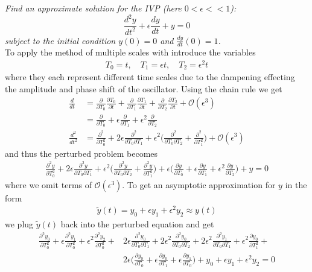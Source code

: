 \documentclass[12pt]{article}
\theoremstyle{remark}
\begin{document}
\textit{Find an approximate solution for the IVP (here $0 < \epsilon << 1$):}
$$ \frac{d^2y}{dt^2} + \epsilon\frac{dy}{dt} + y = 0 $$
\textit{subject to the initial condition $y(0) = 0$ and $\frac{dy}{dt}(0) = 1$.} \\

To apply the method of multiple scales with introduce the variables
\begin{align*}
	T_0 = t, \quad T_1 = \epsilon t, \quad T_2 = \epsilon^2 t
\end{align*}
where they each represent different time scales due to the dampening effecting the amplitude and phase shift of the oscillator. Using the chain rule we get
\begin{align*}
	\frac{d}{dt} & = \frac{\partial}{\partial T_0}\frac{\partial T_0}{\partial t} + \frac{\partial}{\partial T_1}\frac{\partial T_1}{\partial t} + \frac{\partial}{\partial T_2}\frac{\partial T_2}{\partial t} + \mathcal{O}(\epsilon^3)\\
	& = \frac{\partial}{\partial T_0} + \epsilon\frac{\partial}{\partial T_1} + \epsilon^2\frac{\partial}{\partial T_2} \\
	\frac{d^2}{dt^2} & = \frac{\partial^2}{\partial T_0^2} + 2\epsilon\frac{\partial^2}{\partial T_0 \partial T_1} + \epsilon^2\bigg(\frac{\partial^2}{\partial T_0 \partial T_2} + \frac{\partial^2}{\partial T_1^2}\bigg) + \mathcal{O}(\epsilon^3)
\end{align*}
and thus the perturbed problem becomes
\begin{align*}
	\frac{\partial^2y}{\partial T_0^2} + 2\epsilon\frac{\partial^2y}{\partial T_0 \partial T_1} + \epsilon^2\bigg(\frac{\partial^2y}{\partial T_0 \partial T_2} + \frac{\partial^2y}{\partial T_1^2}\bigg) + \epsilon\bigg(\frac{\partial y}{\partial T_0} + \epsilon\frac{\partial y}{\partial T_1} + \epsilon^2\frac{\partial y}{\partial T_2}\bigg) + y = 0
\end{align*}
where we omit terms of $\mathcal{O}(\epsilon^3)$. To get an asymptotic approximation for $y$ in the form
\begin{align*}
	\tilde{y}(t) = y_0 + \epsilon y_1 + \epsilon^2y_2 \approx y(t)
\end{align*}
we plug $\tilde{y}(t)$ back into the perturbed equation and get 
\begin{align*}
	\frac{\partial^2y_0}{\partial T_0^2} + \epsilon\frac{\partial^2y_1}{\partial T_0^2} + \epsilon^2\frac{\partial^2y_2}{\partial T_0^2} + & 2\epsilon\frac{\partial^2y_0}{\partial T_0\partial T_1} + 2\epsilon^2\frac{\partial^2y_0}{\partial T_0 \partial T_2} + 2\epsilon^2\frac{\partial^2y_1}{\partial T_0 \partial T_1} + \epsilon^2\frac{\partial y_0}{\partial T_1^2} + \\ & 2\epsilon\bigg(\frac{\partial y_0}{\partial T_0} + \epsilon \frac{\partial y_0}{\partial T_1} + \epsilon\frac{\partial y_1}{\partial T_0}\bigg) + y_0 + \epsilon y_1 + \epsilon^2y_2 = 0
\end{align*}
\end{document}

